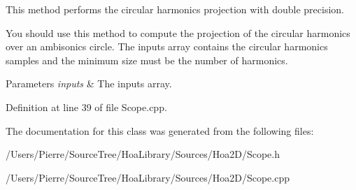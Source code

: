 This method performs the circular harmonics projection with double precision. 

You should use this method to compute the projection of the circular harmonics over an ambisonics circle. The inputs array contains the circular harmonics samples and the minimum size must be the number of harmonics.


\begin{DoxyParams}{Parameters}
{\em inputs} & The inputs array. \\
\hline
\end{DoxyParams}


Definition at line 39 of file Scope.\-cpp.



The documentation for this class was generated from the following files\-:\begin{DoxyCompactItemize}
\item 
/\-Users/\-Pierre/\-Source\-Tree/\-Hoa\-Library/\-Sources/\-Hoa2\-D/Scope.\-h\item 
/\-Users/\-Pierre/\-Source\-Tree/\-Hoa\-Library/\-Sources/\-Hoa2\-D/Scope.\-cpp\end{DoxyCompactItemize}
